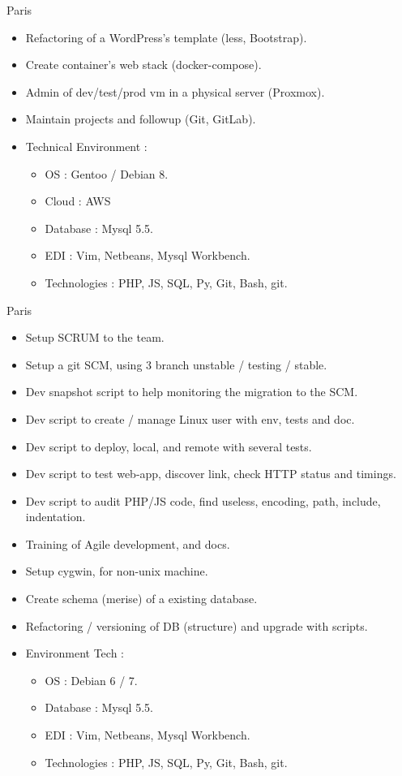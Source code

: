 \documentclass[10pt,a4paper,sans]{moderncv}
\begin{document}
\vskip 2cm

{Paris}{
  \begin{itemize}%
    \item Refactoring of a WordPress's template (less, Bootstrap).
    \item Create container's web stack (docker-compose).
    \item Admin of dev/test/prod vm in a physical server (Proxmox).
    \item Maintain projects and followup (Git, GitLab).
    \item Technical Environment :
      \begin{itemize}%
        \item OS : Gentoo / Debian 8.
        \item Cloud : AWS
        \item Database : Mysql 5.5.
        \item EDI : Vim, Netbeans, Mysql Workbench.
        \item Technologies : PHP, JS, SQL, Py, Git, Bash, git.
      \end{itemize}
  \end{itemize}}

\vskip 2cm

{Paris}{
  \begin{itemize}%
    \item Setup SCRUM to the team.
    \item Setup a git SCM, using 3 branch unstable / testing / stable.
    \item Dev snapshot script to help monitoring the migration to the SCM.
    \item Dev script to create / manage Linux user with env, tests and doc.
    \item Dev script to deploy, local, and remote with several tests.
    \item Dev script to test web-app, discover link, check HTTP status and timings.
    \item Dev script to audit PHP/JS code, find useless, encoding, path, include, indentation.
    \item Training of Agile development, and docs.
    \item Setup cygwin, for non-unix machine.
    \item Create schema (merise) of a existing database.
    \item Refactoring / versioning of DB (structure) and upgrade with scripts.
    \item Environment Tech :
      \begin{itemize}%
        \item OS : Debian 6 / 7.
        \item Database : Mysql 5.5.
        \item EDI : Vim, Netbeans, Mysql Workbench.
        \item Technologies : PHP, JS, SQL, Py, Git, Bash, git.
      \end{itemize}
  \end{itemize}}
\end{document}
